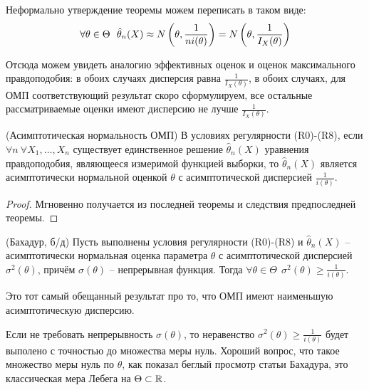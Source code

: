 \begin{note}
    Неформально утверждение теоремы можем переписать в таком виде:
    \[
        \forall \theta \in \Theta \ \ \hat{\theta}_n(X) \approx N\left(\theta, \frac{1}{n i(\theta)}\right) = N\left(\theta, \frac{1}{I_X(\theta)}\right)
    \]

    Отсюда можем увидеть аналогию эффективных оценок и оценок максимального правдоподобия: в обоих случаях дисперсия равна $\frac{1}{I_X(\theta)}$, в обоих случаях, для ОМП соответствующий результат скоро сформулируем, все остальные рассматриваемые оценки имеют дисперсию не лучше $\frac{1}{I_X(\theta)}$.
\end{note}

\begin{corollary} (Асимптотическая нормальность ОМП)
    В условиях регулярности (R0)-(R8), если $\forall n \ \forall X_1, \dots, X_n$ существует единственное решение $\hat{\theta}_n(X)$ уравнения правдоподобия, являющееся измеримой функцией выборки, то $\hat{\theta}_n(X)$ является асимптотически нормальной оценкой $\theta$ с асимптотической дисперсией $\frac{1}{i(\theta)}$.
\end{corollary}

\begin{proof}
    Мгновенно получается из последней теоремы и следствия предпоследней теоремы.
\end{proof}

\begin{theorem} (Бахадур, б/д)
    Пусть выполнены условия регулярности (R0)-(R8) и $\hat{\theta}_n(X)$ -- асимптотически нормальная оценка параметра $\theta$ с асимптотической дисперсией $\sigma^2(\theta)$, причём $\sigma(\theta)$ -- непрерывная функция. Тогда $\forall \theta \in \Theta \ \ \sigma^2(\theta) \ge \frac{1}{i(\theta)}$.
\end{theorem}

\begin{note}
    Это тот самый обещанный результат про то, что ОМП имеют наименьшую асимптотическую дисперсию.
\end{note}

\begin{note}
    Если не требовать непрерывность $\sigma(\theta)$, то неравенство $\sigma^2(\theta) \ge \frac{1}{i(\theta)}$ будет выполено с точностью до множества меры нуль. Хороший вопрос, что такое множество меры нуль по $\theta$, как показал беглый просмотр статьи Бахадура, это классическая мера Лебега на $\Theta \subset \mathbb{R}$.
\end{note}

